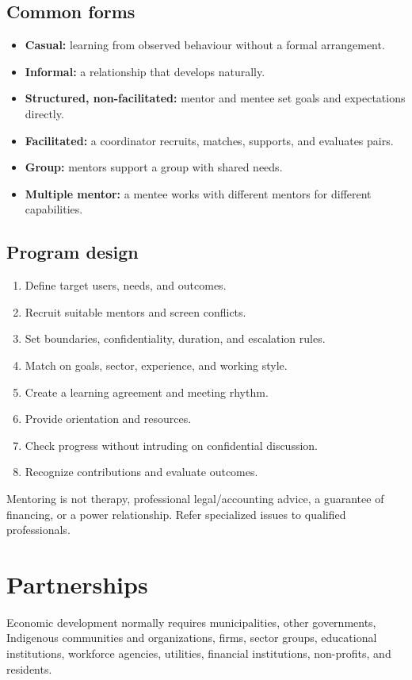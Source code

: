 \documentclass[11pt,letterpaper,oneside,openany]{book}
\begin{document}
\subsection[Common forms]{Common forms}
\begin{itemize}
\item \textbf{Casual:} learning from observed behaviour without a formal arrangement.
\item \textbf{Informal:} a relationship that develops naturally.
\item \textbf{Structured, non-facilitated:} mentor and mentee set goals and expectations directly.
\item \textbf{Facilitated:} a coordinator recruits, matches, supports, and evaluates pairs.
\item \textbf{Group:} mentors support a group with shared needs.
\item \textbf{Multiple mentor:} a mentee works with different mentors for different capabilities.
\end{itemize}


\subsection[Program design]{Program design}
\begin{enumerate}
\item Define target users, needs, and outcomes.
\item Recruit suitable mentors and screen conflicts.
\item Set boundaries, confidentiality, duration, and escalation rules.
\item Match on goals, sector, experience, and working style.
\item Create a learning agreement and meeting rhythm.
\item Provide orientation and resources.
\item Check progress without intruding on confidential discussion.
\item Recognize contributions and evaluate outcomes.
\end{enumerate}


Mentoring is not therapy, professional legal/accounting advice, a guarantee of financing, or a power relationship. Refer specialized issues to qualified professionals.


\section[Partnerships]{Partnerships}
Economic development normally requires municipalities, other governments, Indigenous communities and organizations, firms, sector groups, educational institutions, workforce agencies, utilities, financial institutions, non-profits, and residents.
\end{document}
